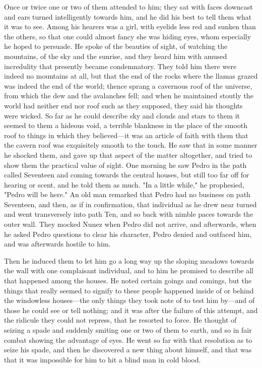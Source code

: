 \documentclass[courier]{sffms}
\begin{document}
Once or twice one or two of them attended to him; they sat with faces
downcast and ears turned intelligently towards him, and he did his
best to tell them what it was to see. Among his hearers was a girl,
with eyelids less red and sunken than the others, so that one could
almost fancy she was hiding eyes, whom especially he hoped to
persuade. He spoke of the beauties of sight, of watching the
mountains, of the sky and the sunrise, and they heard him with amused
incredulity that presently became condemnatory. They told him there
were indeed no mountains at all, but that the end of the rocks where
the llamas grazed was indeed the end of the world; thence sprang a
cavernous roof of the universe, from which the dew and the avalanches
fell; and when he maintained stoutly the world had neither end nor
roof such as they supposed, they said his thoughts were wicked. So far
as he could describe sky and clouds and stars to them it seemed to
them a hideous void, a terrible blankness in the place of the smooth
roof to things in which they believed---it was an article of faith with
them that the cavern roof was exquisitely smooth to the touch. He saw
that in some manner he shocked them, and gave up that aspect of the
matter altogether, and tried to show them the practical value of
sight. One morning he saw Pedro in the path called Seventeen and
coming towards the central houses, but still too far off for hearing
or scent, and he told them as much. "In a little while," he
prophesied, "Pedro will be here." An old man remarked that Pedro had
no business on path Seventeen, and then, as if in confirmation, that
individual as he drew near turned and went transversely into path Ten,
and so back with nimble paces towards the outer wall. They mocked
Nunez when Pedro did not arrive, and afterwards, when he asked Pedro
questions to clear his character, Pedro denied and outfaced him, and
was afterwards hostile to him.

Then he induced them to let him go a long way up the sloping meadows
towards the wall with one complaisant individual, and to him he
promised to describe all that happened among the houses. He noted
certain goings and comings, but the things that really seemed to
signify to these people happened inside of or behind the windowless
houses---the only things they took note of to test him by---and of those
he could see or tell nothing; and it was after the failure of this
attempt, and the ridicule they could not repress, that he resorted to
force. He thought of seizing a spade and suddenly smiting one or two
of them to earth, and so in fair combat showing the advantage of
eyes. He went so far with that resolution as to seize his spade, and
then he discovered a new thing about himself, and that was that it was
impossible for him to hit a blind man in cold blood.
\end{document}

